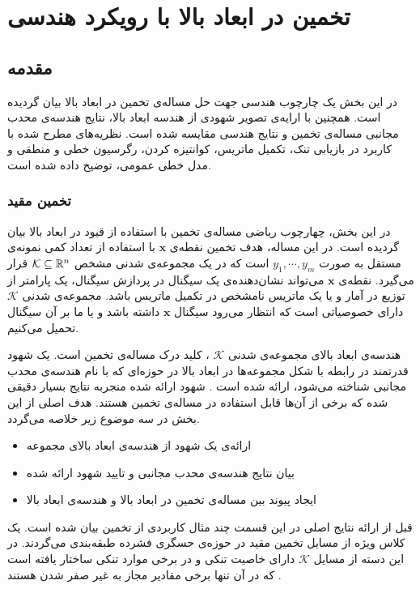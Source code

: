 \chapter{تخمین در ابعاد بالا با رویکرد هندسی}
\label{ch:HDE}
\newpage
\section{مقدمه}
در این بخش یک چارچوب هندسی جهت حل مساله‌ی تخمین در ابعاد بالا بیان گردیده است. همچنین با ارایه‌ی تصویر شهودی از هندسه ابعاد بالا، نتایج هندسه‌ی محدب مجانبی
 مساله‌ی تخمین و نتایج هندسی مقایسه شده است. نظریه‌های مطرح شده با کاربرد در بازیابی تنک، تکمیل ماتریس، کوانتیزه کردن، رگرسیون خطی و منطقی و مدل خطی عمومی، توضیح داده شده است. 
\subsection{تخمین مقید}
در این بخش،  چهارچوب ریاضی مساله‌ی تخمین با استفاده از قیود در ابعاد بالا بیان گردیده است. در این مساله، هدف تخمین نقطه‌ی 
$\bm{x}$
با استفاده از تعداد کمی نمونه‌ی مستقل به صورت 
$y_1,\cdots,y_m$
است که در یک مجموعه‌ی شدنی مشخص
$\mathcal{K} \subseteq \mathbb{R}^{n}$
قرار می‌گیرد. نقطه‌ی 
$\bm{x}$
می‌تواند نشان‌دهنده‌ی یک سیگنال در پردازش سیگنال، یک پارامتر از توزیع در آمار و یا یک ماتریس نامشخص در تکمیل ماتریس باشد. مجموعه‌ی شدنی
$\mathcal{K} $
دارای خصوصیاتی است که انتظار می‌رود سیگنال
$\bm{x}$
داشته باشد و یا ما بر آن سیگنال تحمیل می‌کنیم.


هندسه‌ی ابعاد بالای مجموعه‌ی شدنی
$\mathcal{K} $
، کلید درک مساله‌ی تخمین است. یک شهود قدرتمند در رابطه با شکل مجموعه‌ها در ابعاد بالا در حوزه‌ای که با نام هندسه‌ی محدب مجانبی شناخته می‌شود، ارائه شده است
\cite{ball1997elementary,brazitikos2014geometry}.
شهود ارائه شده منجربه  نتایج بسیار دقیقی شده که برخی از آن‌ها قابل استفاده در مساله‌ی تخمین هستند. هدف اصلی از این بخش در سه موضوع زیر خلاصه می‌گردد.
\begin{itemize}
\item{
ارائه‌ی یک شهود از هندسه‌ی ابعاد بالا‌ی مجموعه
}
\item{
بیان نتایج هندسه‌ی محدب مجانبی و تایید شهود ارائه شده
}
\item{
ایجاد پیوند بین مساله‌ی تخمین در ابعاد بالا و هندسه‌ی ابعاد بالا
}
\end{itemize}

قبل از ارائه نتایج اصلی در این قسمت چند مثال کاربردی از تخمین بیان شده است.  یک کلاس ویژه از مسایل تخمین مقید در حوزه‌ی حسگری فشرده طبقه‌بندی می‌گردند. در این دسته از مسایل 
$\mathcal{K}$
دارای خاصیت تنکی  و  در برخی موارد تنکی ساختار یافته است که در آن تنها برخی مقادیر مجاز به غیر صفر شدن هستند
\cite{rao2011tight}.


